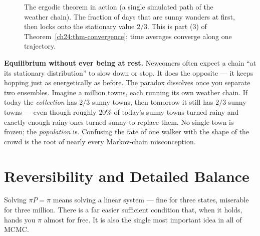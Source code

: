 \begin{figure}[H]
  \centering
  \caption{The ergodic theorem in action (a single simulated path of the weather
  chain). The fraction of days that are sunny wanders at first, then locks onto
  the stationary value $2/3$. This is part (3) of
  Theorem~\ref{ch24:thm-convergence}: time averages converge along one
  trajectory.}
  \label{ch24:fig-ergodic-timeavg}
\end{figure}

\begin{paradoxbox}
\textbf{Equilibrium without ever being at rest.} Newcomers often expect a chain
``at its stationary distribution'' to slow down or stop. It does the opposite ---
it keeps hopping just as energetically as before. The paradox dissolves once you
separate two ensembles. Imagine a million towns, each running its own weather
chain. If today the \emph{collection} has $2/3$ sunny towns, then tomorrow it
still has $2/3$ sunny towns --- even though roughly $20\%$ of today's sunny towns
turned rainy and exactly enough rainy ones turned sunny to replace them. No single
town is frozen; the \emph{population} is. Confusing the fate of one walker with
the shape of the crowd is the root of nearly every Markov-chain misconception.
\end{paradoxbox}

\section{Reversibility and Detailed Balance}
\label{ch24:reversibility}

Solving $\pi P = \pi$ means solving a linear system --- fine for three states,
miserable for three million. There is a far easier sufficient condition that, when
it holds, hands you $\pi$ almost for free. It is also the single most important
idea in all of MCMC.

